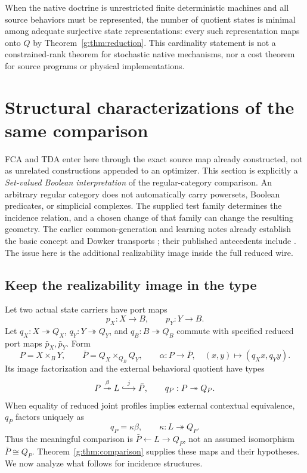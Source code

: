 \documentclass[11pt]{article}
\theoremstyle{definition}
\theoremstyle{remark}\newtheorem{remark}[theorem]{Remark}
\begin{document}
When the native doctrine is unrestricted finite deterministic machines
and all source behaviors must be represented, the number of quotient
states is minimal among adequate surjective state representations: every
such representation maps onto $Q$ by Theorem~\ref{g:thm:reduction}. This
cardinality statement is not a constrained-rank theorem for stochastic
native mechanisms, nor a cost theorem for source programs or physical
implementations.



\section{Structural characterizations of the same comparison}
\label{sec:views}
FCA and TDA enter here through the exact source map already constructed,
not as unrelated constructions appended to an optimizer. This section is
explicitly a \emph{Set-valued Boolean interpretation} of the regular-category
comparison. An arbitrary regular category does not automatically carry
powersets, Boolean predicates, or simplicial complexes. The supplied test
family determines the incidence relation, and a chosen change of that family
can change the resulting geometry. The earlier common-generation and
learning notes already establish the basic concept and Dowker transports
\cite{CommonNote,LearningNote}; their published antecedents include
\cite{gp,ayzenberg,brun}. The issue here is the additional realizability
image inside the full reduced wire.

\subsection{Keep the realizability image in the type}
Let two actual state carriers have port maps
\[
 p_X:X\longrightarrow B,\qquad p_Y:Y\longrightarrow B.
\]
Let $q_X:X\twoheadrightarrow Q_X$, $q_Y:Y\twoheadrightarrow Q_Y$,
and $q_B:B\twoheadrightarrow Q_B$ commute with specified reduced port
maps $\bar p_X,\bar p_Y$. Form
\[
 P=X\times_B Y,\qquad
 \bar P=Q_X\times_{Q_B}Q_Y,
 \qquad
 \alpha:P\longrightarrow\bar P,
 \quad (x,y)\longmapsto(q_Xx,q_Yy).
\]
Its image factorization and the external behavioral quotient have types
\begin{equation}
 P\mathrel{\mathop{\twoheadrightarrow}^{\beta}}L
 \mathrel{\mathop{\lhook\joinrel\longrightarrow}^{j}}\bar P,
 \qquad q_P:P\twoheadrightarrow Q_P.
 \label{v:eq:span}
\end{equation}
When equality of reduced joint profiles implies external contextual
equivalence, $q_P$ factors uniquely as
\begin{equation}
 q_P=\kappa\beta,\qquad \kappa:L\twoheadrightarrow Q_P.
 \label{v:eq:kappa}
\end{equation}
Thus the meaningful comparison is $\bar P\leftarrow L\to Q_P$, not
an assumed isomorphism $\bar P\cong Q_P$. Theorem~\ref{g:thm:comparison} supplies these maps and their hypotheses.
We now analyze what follows for incidence structures.
\end{document}
